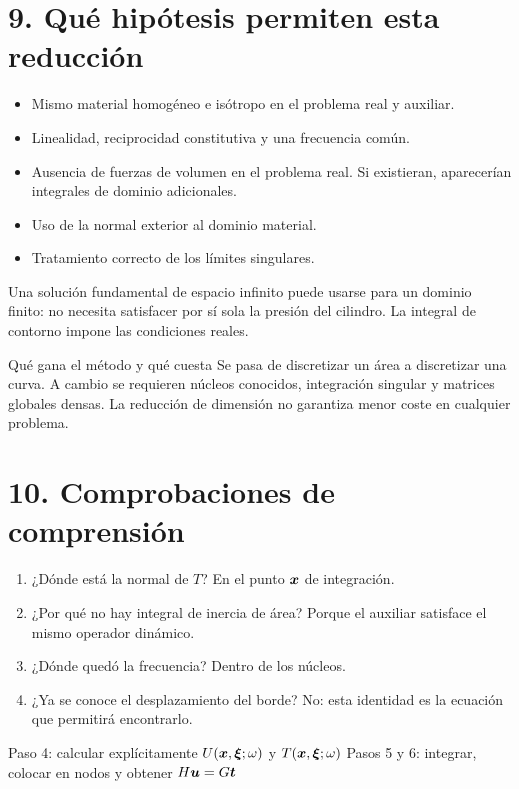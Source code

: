 \documentclass[11pt]{article}
\begin{document}
\section*{9. Qué hipótesis permiten esta reducción}
\begin{itemize}
 \item Mismo material homogéneo e isótropo en el problema real y auxiliar.
 \item Linealidad, reciprocidad constitutiva y una frecuencia común.
 \item Ausencia de fuerzas de volumen en el problema real.
 Si existieran, aparecerían integrales de dominio adicionales.
 \item Uso de la normal exterior al dominio material.
 \item Tratamiento correcto de los límites singulares.
\end{itemize}
Una solución fundamental de espacio infinito puede usarse para un dominio
finito: no necesita satisfacer por sí sola la presión del cilindro.
La integral de contorno impone las condiciones reales.

\begin{resultado}{Qué gana el método y qué cuesta}
Se pasa de discretizar un área a discretizar una curva. A cambio se
requieren núcleos conocidos, integración singular y matrices globales densas.
La reducción de dimensión no garantiza menor coste en cualquier problema.
\end{resultado}

\section*{10. Comprobaciones de comprensión}
\begin{enumerate}
 \item ¿Dónde está la normal de \(T\)? En el punto \(\bm{x}\) de integración.
 \item ¿Por qué no hay integral de inercia de área? Porque el auxiliar
 satisface el mismo operador dinámico.
 \item ¿Dónde quedó la frecuencia? Dentro de los núcleos.
 \item ¿Ya se conoce el desplazamiento del borde? No: esta identidad es
 la ecuación que permitirá encontrarlo.
\end{enumerate}
{Paso 4: calcular explícitamente \(U(\bm{x},\bm{\xi};\omega)\) y \(T(\bm{x},\bm{\xi};\omega)\)}
{Pasos 5 y 6: integrar, colocar en nodos y obtener \(H\bm{u}=G\bm{t}\)}
\fuentes
\end{document}
